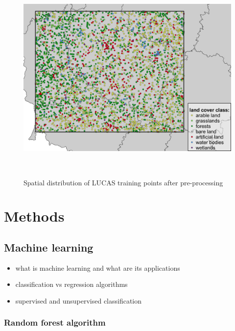\documentclass{amuthesis}
\begin{document}
\begin{figure}[t]

{\centering \includegraphics[width=1\textwidth,height=4.16667in]{./figures/lucas_distribution.png}

}

\caption{\label{fig-rycina3}Spatial distribution of LUCAS training
points after pre-processing}

\end{figure}


\hypertarget{sec-methods}{%
\chapter{Methods}\label{sec-methods}}

\hypertarget{sec-ml}{%
\section{Machine learning}\label{sec-ml}}

\begin{itemize}
\item
  what is machine learning and what are its applications
\item
  classification vs regression algorithms
\item
  supervised and unsupervised classification
\end{itemize}

\hypertarget{sec-rf}{%
\subsection{Random forest algorithm}\label{sec-rf}}
\end{document}
